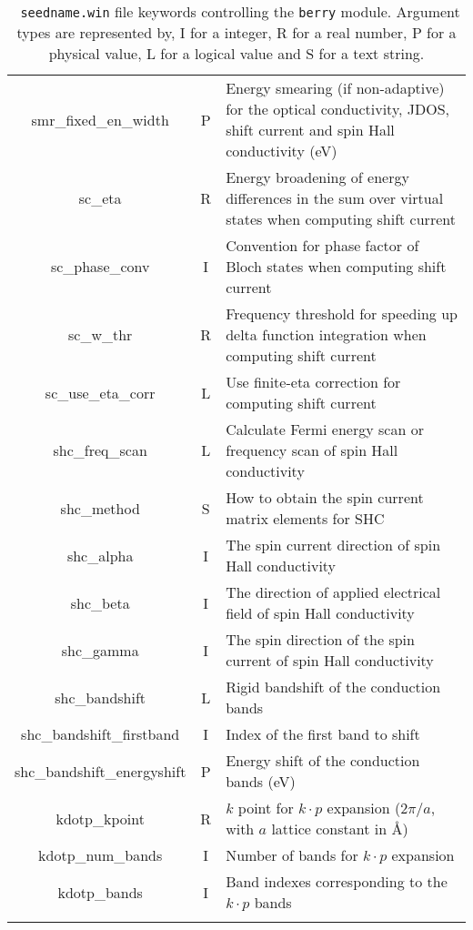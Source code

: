 \begin{longtable}{|c|c|p{6cm}|}
  {\sc [kubo\_]smr\_fixed\_en\_width} & P  & Energy smearing (if non-adaptive)
  for the optical conductivity, JDOS, shift current and spin Hall conductivity (eV) \\
  {\sc sc\_eta} & R  & Energy broadening of energy differences in the sum over virtual states when computing shift current\\
  {\sc sc\_phase\_conv} & I  & Convention for phase factor of Bloch states when computing shift current\\
  {\sc sc\_w\_thr} & R  & Frequency threshold for speeding up delta function integration when computing shift current\\
  {\sc sc\_use\_eta\_corr} & L  & Use finite-eta correction for computing shift current\\
  {\sc shc\_freq\_scan} & L  & Calculate Fermi energy scan or frequency scan of spin Hall conductivity\\
  {\sc shc\_method} & S  & How to obtain the spin current matrix elements for SHC\\
  {\sc shc\_alpha} & I  & The spin current direction of spin Hall conductivity\\
  {\sc shc\_beta} & I  & The direction of applied electrical field of spin Hall conductivity\\
  {\sc shc\_gamma} & I  & The spin direction of the spin current of spin Hall conductivity\\
  {\sc shc\_bandshift} & L & Rigid bandshift of the conduction bands\\
  {\sc shc\_bandshift\_firstband} & I & Index of the first band to shift\\
  {\sc shc\_bandshift\_energyshift} & P & Energy shift of the conduction bands (eV)\\
  {\sc kdotp\_kpoint} & R & $k$ point for $k\cdot p$ expansion ($2\pi/a$, with $a$ lattice constant in \AA)\\
  {\sc kdotp\_num\_bands} & I & Number of bands for $k\cdot p$ expansion \\
  {\sc kdotp\_bands} & I & Band indexes corresponding to the $k\cdot p$ bands \\
  \hline
\caption[Parameter file keywords controlling the Berry module.]  {{\tt
    seedname.win} file keywords controlling the {\tt berry}
  module. Argument types are represented by, I for a integer, R for a
  real number, P for a physical value, L for a logical value and S for
  a text string.}
\label{parameter_keywords_berry}
\end{longtable}


